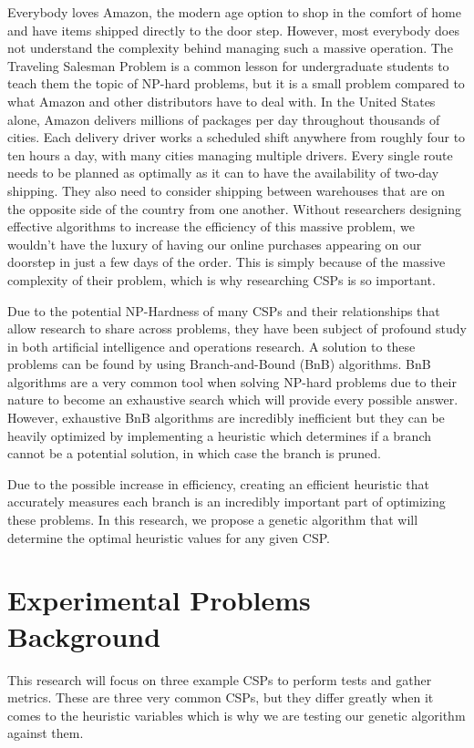 \documentclass[10pt,twoside]{IEEEtran}
\begin{document}
Everybody loves Amazon, the modern age option to shop in the comfort of home and have items shipped directly to the door step. However, most everybody does not understand the complexity behind managing such a massive operation. The Traveling Salesman Problem is a common lesson for undergraduate students to teach them the topic of NP-hard problems, but it is a small problem compared to what Amazon and other distributors have to deal with. In the United States alone, Amazon delivers millions of packages per day throughout thousands of cities. Each delivery driver works a scheduled shift anywhere from roughly four to ten hours a day, with many cities managing multiple drivers. Every single route needs to be planned as optimally as it can to have the availability of two-day shipping. They also need to consider shipping between warehouses that are on the opposite side of the country from one another. Without researchers designing effective algorithms to increase the efficiency of this massive problem, we wouldn't have the luxury of having our online purchases appearing on our doorstep in just a few days of the order. This is simply because of the massive complexity of their problem, which is why researching CSPs is so important.

Due to the potential NP-Hardness of many CSPs and their relationships that allow research to share across problems, they have been subject of profound study in both artificial intelligence and operations research. A solution to these problems can be found by using Branch-and-Bound (BnB) algorithms. BnB algorithms are a very common tool when solving NP-hard problems due to their nature to become an exhaustive search which will provide every possible answer. However, exhaustive BnB algorithms are incredibly inefficient but they can be heavily optimized by implementing a heuristic which determines if a branch cannot be a potential solution, in which case the branch is pruned. 

Due to the possible increase in efficiency, creating an efficient heuristic that accurately measures each branch is an incredibly important part of optimizing these problems. In this research, we propose a genetic algorithm that will determine the optimal heuristic values for any given CSP.

\section{Experimental Problems Background}
This research will focus on three example CSPs to perform tests and gather metrics. These are three very common CSPs, but they differ greatly when it comes to the heuristic variables which is why we are testing our genetic algorithm against them.
\end{document}
